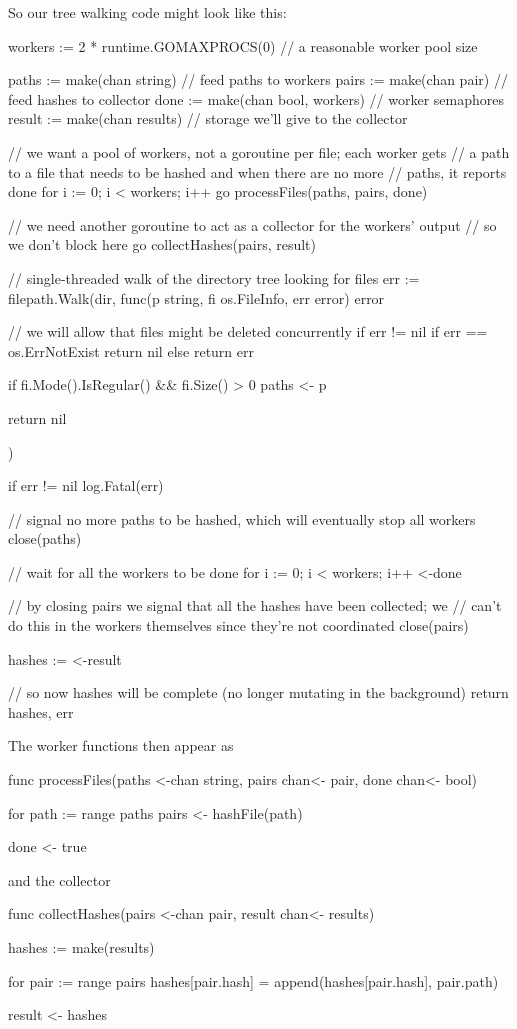 \documentclass[12pt,notitlepage]{article}
\begin{document}
So our tree walking code might look like this:
\begin{golang}
	workers := 2 * runtime.GOMAXPROCS(0) // a reasonable worker pool size

	paths := make(chan string)       // feed paths to workers
	pairs := make(chan pair)         // feed hashes to collector
	done := make(chan bool, workers) // worker semaphores
	result := make(chan results)     // storage we'll give to the collector

	// we want a pool of workers, not a goroutine per file; each worker gets
    // a path to a file that needs to be hashed and when there are no more
    // paths, it reports done
	for i := 0; i < workers; i++ {
		go processFiles(paths, pairs, done)
	}

	// we need another goroutine to act as a collector for the workers' output
    // so we don't block here
	go collectHashes(pairs, result)

	// single-threaded walk of the directory tree looking for files
	err := filepath.Walk(dir, func(p string, fi os.FileInfo, err error) error {
        // we will allow that files might be deleted concurrently
		if err != nil {
			if err == os.ErrNotExist {
				return nil
			} else {
				return err
			}
		}

		if fi.Mode().IsRegular() && fi.Size() > 0 {
			paths <- p
		}

		return nil
	})

	if err != nil {
		log.Fatal(err)
	}

	// signal no more paths to be hashed, which will eventually stop all workers
	close(paths)

	// wait for all the workers to be done
	for i := 0; i < workers; i++ {
		<-done
	}

	// by closing pairs we signal that all the hashes have been collected; we
    // can't do this in the workers themselves since they're not coordinated
	close(pairs)

	hashes := <-result

	// so now hashes will be complete (no longer mutating in the background)
	return hashes, err
\end{golang}
The worker functions then appear as
\begin{golang}
func processFiles(paths <-chan string, pairs chan<- pair, done chan<- bool) {
	for path := range paths {
		pairs <- hashFile(path)
	}

	done <- true
}
\end{golang}
and the collector
\begin{golang}
func collectHashes(pairs <-chan pair, result chan<- results) {
	hashes := make(results)

	for pair := range pairs {
		hashes[pair.hash] = append(hashes[pair.hash], pair.path)
	}

	result <- hashes
}
\end{golang}
\end{document}
